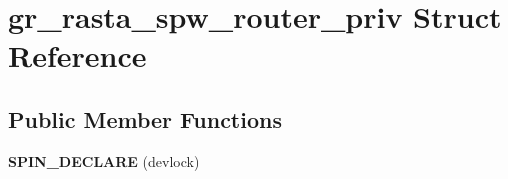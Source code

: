 \hypertarget{structgr__rasta__spw__router__priv}{}\section{gr\+\_\+rasta\+\_\+spw\+\_\+router\+\_\+priv Struct Reference}
\label{structgr__rasta__spw__router__priv}
\subsection*{Public Member Functions}
\begin{DoxyCompactItemize}
\item 
\mbox{\label{structgr__rasta__spw__router__priv_aa390b3ab1273d7165eda9591ffb2ad09}} 
{\bfseries S\+P\+I\+N\+\_\+\+D\+E\+C\+L\+A\+RE} (devlock)
\end{DoxyCompactItemize}
